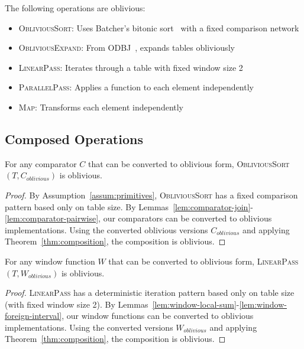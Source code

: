 \begin{assumption}
\label{assum:primitives}
The following operations are oblivious:
\begin{itemize}
\item \textsc{ObliviousSort}: Uses Batcher's bitonic sort~\cite{batcher1968} with a fixed comparison network
\item \textsc{ObliviousExpand}: From ODBJ~\cite{krastnikov2020}, expands tables obliviously
\item \textsc{LinearPass}: Iterates through a table with fixed window size 2
\item \textsc{ParallelPass}: Applies a function to each element independently
\item \textsc{Map}: Transforms each element independently
\end{itemize}
\end{assumption}

\subsection{Composed Operations}

\begin{lemma}
\label{lem:sort-with-comparator}
For any comparator $C$ that can be converted to oblivious form, \textsc{ObliviousSort}$(T, C_{oblivious})$ is oblivious.
\end{lemma}

\begin{proof}
By Assumption~\ref{assum:primitives}, \textsc{ObliviousSort} has a fixed comparison pattern based only on table size. By Lemmas~\ref{lem:comparator-join}-\ref{lem:comparator-pairwise}, our comparators can be converted to oblivious implementations. Using the converted oblivious versions $C_{oblivious}$ and applying Theorem~\ref{thm:composition}, the composition is oblivious.\end{proof}

\begin{lemma}
\label{lem:linear-with-window}
For any window function $W$ that can be converted to oblivious form, \textsc{LinearPass}$(T, W_{oblivious})$ is oblivious.
\end{lemma}

\begin{proof}
\textsc{LinearPass} has a deterministic iteration pattern based only on table size (with fixed window size 2). By Lemmas~\ref{lem:window-local-sum}-\ref{lem:window-foreign-interval}, our window functions can be converted to oblivious implementations. Using the converted versions $W_{oblivious}$ and applying Theorem~\ref{thm:composition}, the composition is oblivious.\end{proof}

